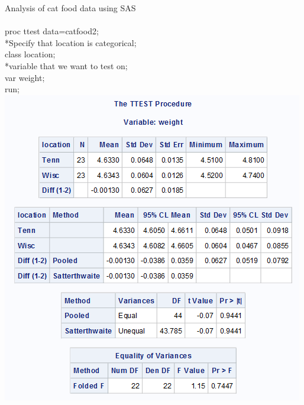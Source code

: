 \newpage
\begin{multicols}{2}
Analysis of cat food data using SAS\\~\\
proc ttest data=catfood2;\\
*Specify that location is categorical;\\
class location;\\
*variable that we want to test on;\\
var weight;\\
run;\\
\columnbreak
\includegraphics[scale=0.75]{catfoodttest}
\end{multicols}
